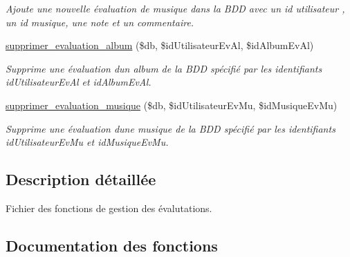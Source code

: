 \begin{DoxyCompactItemize}
\begin{DoxyCompactList}\small\item\em Ajoute une nouvelle évaluation de musique dans la B\+DD avec un id utilisateur , un id musique, une note et un commentaire. \end{DoxyCompactList}\item 
\hyperlink{fonctionEvaluer_8php_a1a585eccb331d289a8fce1c86e8ca9ea}{supprimer\+\_\+evaluation\+\_\+album} (\$db, \$id\+Utilisateur\+Ev\+Al, \$id\+Album\+Ev\+Al)
\begin{DoxyCompactList}\small\item\em Supprime une évaluation d\textquotesingle{}un album de la B\+DD spécifié par les identifiants \textquotesingle{}id\+Utilisateur\+Ev\+Al\textquotesingle{} et \textquotesingle{}id\+Album\+Ev\+Al\textquotesingle{}. \end{DoxyCompactList}\item 
\hyperlink{fonctionEvaluer_8php_a2583fcafc6e435d36a55dd8bfa5f0136}{supprimer\+\_\+evaluation\+\_\+musique} (\$db, \$id\+Utilisateur\+Ev\+Mu, \$id\+Musique\+Ev\+Mu)
\begin{DoxyCompactList}\small\item\em Supprime une évaluation d\textquotesingle{}une musique de la B\+DD spécifié par les identifiants \textquotesingle{}id\+Utilisateur\+Ev\+Mu\textquotesingle{} et \textquotesingle{}id\+Musique\+Ev\+Mu\textquotesingle{}. \end{DoxyCompactList}\end{DoxyCompactItemize}


\subsection{Description détaillée}
Fichier des fonctions de gestion des évalutations. 



\subsection{Documentation des fonctions}
\mbox{\label{fonctionEvaluer_8php_ac12baf472e96e6ae3b5147e6014bf830}} 
